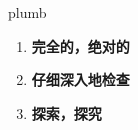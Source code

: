 
\begin{frame}
{\huge plumb}
\begin{center}
\begin{enumerate}\Large
  \item \textbf{完全的，绝对的}
  \item \textbf{仔细深入地检查}
  \item \textbf{探索，探究}
\end{enumerate}
\end{center}
\end{frame}
